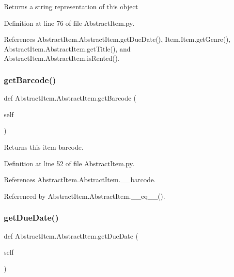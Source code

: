 \begin{DoxyReturn}{Returns}
a string representation of this object 
\end{DoxyReturn}


Definition at line 76 of file Abstract\+Item.\+py.



References Abstract\+Item.\+Abstract\+Item.\+get\+Due\+Date(), Item.\+Item.\+get\+Genre(), Abstract\+Item.\+Abstract\+Item.\+get\+Title(), and Abstract\+Item.\+Abstract\+Item.\+is\+Rented().

\mbox{\label{classAbstractItem_1_1AbstractItem_a9c84bde2c7eadc30f70753b8c54b6fb3}} 
\subsubsection{\texorpdfstring{get\+Barcode()}{getBarcode()}}
{\footnotesize\ttfamily def Abstract\+Item.\+Abstract\+Item.\+get\+Barcode (\begin{DoxyParamCaption}\item[{}]{self }\end{DoxyParamCaption})}



Returns this item barcode. 



Definition at line 52 of file Abstract\+Item.\+py.



References Abstract\+Item.\+Abstract\+Item.\+\_\+\+\_\+barcode.



Referenced by Abstract\+Item.\+Abstract\+Item.\+\_\+\+\_\+eq\+\_\+\+\_\+().

\mbox{\label{classAbstractItem_1_1AbstractItem_abcf92f11f8210ca0e413dc2bc64cb6aa}} 
\subsubsection{\texorpdfstring{get\+Due\+Date()}{getDueDate()}}
{\footnotesize\ttfamily def Abstract\+Item.\+Abstract\+Item.\+get\+Due\+Date (\begin{DoxyParamCaption}\item[{}]{self }\end{DoxyParamCaption})}



